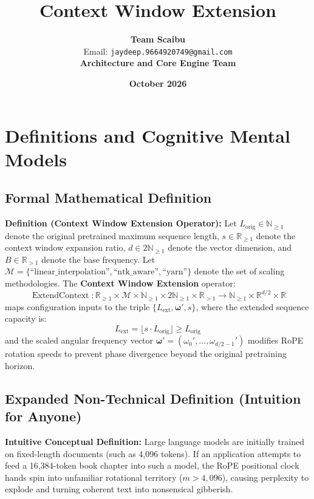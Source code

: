 \documentclass[11pt,a4paper]{article}
\title{\textbf{Context Window Extension}}
\author{\textbf{Team Scaibu} \\ \small Email: \texttt{jaydeep.9664920749@gmail.com} \\ \small \textbf{Architecture and Core Engine Team}}
\date{\textbf{October 2026}}
\theoremstyle{definition}
\begin{document}
\maketitle

\section{Definitions and Cognitive Mental Models}

\subsection{Formal Mathematical Definition}
\textbf{Definition (Context Window Extension Operator):}
Let $L_{\text{orig}} \in \mathbb{N}_{\ge 1}$ denote the original pretrained maximum sequence length, $s \in \mathbb{R}_{\ge 1}$ denote the context window expansion ratio, $d \in 2\mathbb{N}_{\ge 1}$ denote the vector dimension, and $B \in \mathbb{R}_{> 1}$ denote the base frequency. Let $\mathcal{M} = \{\text{``linear\_interpolation''}, \text{``ntk\_aware''}, \text{``yarn''}\}$ denote the set of scaling methodologies.
The \textbf{Context Window Extension} operator:
{\boldmath
\begin{equation}
\operatorname{ExtendContext}: \mathbb{R}_{\ge 1} \times \mathcal{M} \times \mathbb{N}_{\ge 1} \times 2\mathbb{N}_{\ge 1} \times \mathbb{R}_{> 1} \longrightarrow \mathbb{N}_{\ge 1} \times \mathbb{R}^{d/2} \times \mathbb{R}
\end{equation}
}
maps configuration inputs to the triple $\{L_{\text{ext}}, \boldsymbol{\omega}', s\}$, where the extended sequence capacity is:
{\boldmath
\begin{equation}
L_{\text{ext}} = \lfloor s \cdot L_{\text{orig}} \rfloor \ge L_{\text{orig}}
\end{equation}
}
and the scaled angular frequency vector $\boldsymbol{\omega}' = (\omega_0', \dots, \omega_{d/2-1}')$ modifies RoPE rotation speeds to prevent phase divergence beyond the original pretraining horizon.

\subsection{Expanded Non-Technical Definition (Intuition for Anyone)}
\textbf{Intuitive Conceptual Definition:}
Large language models are initially trained on fixed-length documents (such as 4,096 tokens). If an application attempts to feed a 16,384-token book chapter into such a model, the RoPE positional clock hands spin into unfamiliar rotational territory ($m > 4,096$), causing perplexity to explode and turning coherent text into nonsensical gibberish.
\end{document}
